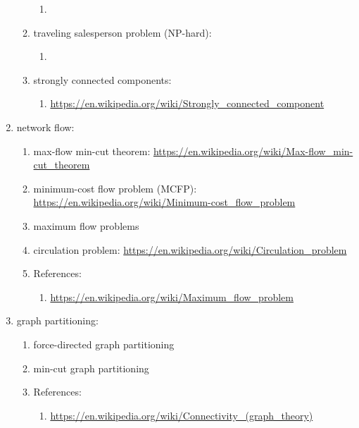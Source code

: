\begin{enumerate}
\begin{enumerate}
\begin{enumerate}
		\item 
		\end{enumerate}
	\item traveling salesperson problem (NP-hard): \vspace{-0.2cm}
		\begin{enumerate} \itemsep -2pt
		\item 
		\end{enumerate}
	\item strongly connected components: \vspace{-0.2cm}
		\begin{enumerate} \itemsep -2pt
		\item \url{https://en.wikipedia.org/wiki/Strongly_connected_component}
		\end{enumerate}
	\end{enumerate}
\item network flow: \vspace{-0.3cm}
	\begin{enumerate} \itemsep -2pt
	\item max-flow min-cut theorem: \url{https://en.wikipedia.org/wiki/Max-flow_min-cut_theorem}
	\item minimum-cost flow problem (MCFP): \url{https://en.wikipedia.org/wiki/Minimum-cost_flow_problem}
	\item maximum flow problems
	\item circulation problem: \url{https://en.wikipedia.org/wiki/Circulation_problem}
	\item References: \vspace{-0.2cm}
		\begin{enumerate} \itemsep -2pt
		\item \url{https://en.wikipedia.org/wiki/Maximum_flow_problem}
		\end{enumerate}
	\end{enumerate}
\item graph partitioning: \vspace{-0.3cm}
	\begin{enumerate} \itemsep -2pt
	\item force-directed graph partitioning
	\item min-cut graph partitioning
	\item References: \vspace{-0.2cm}
		\begin{enumerate} \itemsep -2pt
		\item \url{https://en.wikipedia.org/wiki/Connectivity_(graph_theory)}
		\end{enumerate}

\end{enumerate}
\end{enumerate}
